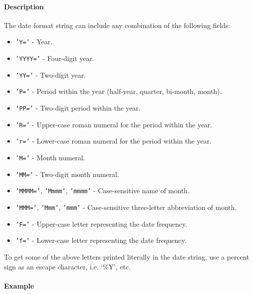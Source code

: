  \paragraph{Description}
 
 The date format string can include any combination of the following
 fields:
 
 \begin{itemize}
 \item
   \texttt{'Y='} - Year.
 \item
   \texttt{'YYYY='} - Four-digit year.
 \item
   \texttt{'YY='} - Two-digit year.
 \item
   \texttt{'P='} - Period within the year (half-year, quarter, bi-month,
   month).
 \item
   \texttt{'PP='} - Two-digit period within the year.
 \item
   \texttt{'R='} - Upper-case roman numeral for the period within the
   year.
 \item
   \texttt{'r='} - Lower-case roman numeral for the period within the
   year.
 \item
   \texttt{'M='} - Month numeral.
 \item
   \texttt{'MM='} - Two-digit month numeral.
 \item
   \texttt{'MMMM='}, \texttt{'Mmmm'}, \texttt{'mmmm'} - Case-sensitive
   name of month.
 \item
   \texttt{'MMM='}, \texttt{'Mmm'}, \texttt{'mmm'} - Case-sensitive
   three-letter abbreviation of month.
 \item
   \texttt{'F='} - Upper-case letter representing the date frequency.
 \item
   \texttt{'f='} - Lower-case letter representing the date frequency.
 \end{itemize}
 
 To get some of the above letters printed literally in the date string,
 use a percent sign as an escape character, i.e. `\%Y', etc.
 
 \paragraph{Example}


